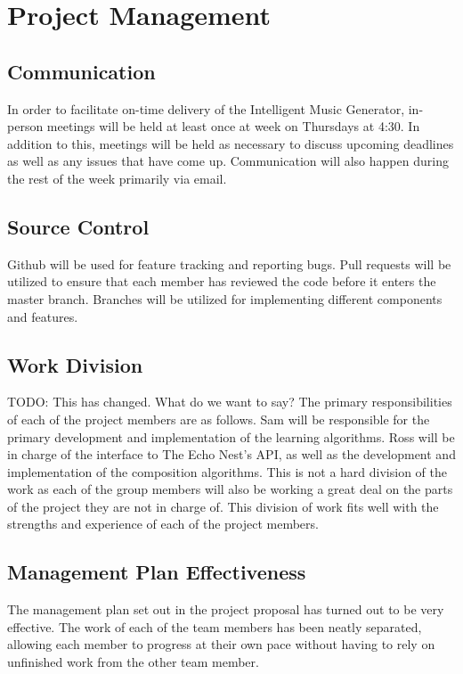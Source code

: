 \documentclass{article}
\begin{document}
\section{Project Management}
\subsection{Communication}
In order to facilitate on-time delivery of the Intelligent Music Generator, in-person meetings 
will be held at least once at week on Thursdays at 4:30. In addition to this, meetings will be 
held as necessary to discuss upcoming deadlines as well as any issues that have come up. 
Communication will also happen during the rest of the week primarily via email.


\subsection{Source Control}
Github will be used for feature tracking and reporting bugs.  Pull requests will be utilized to 
ensure that each member has reviewed the code before it enters the master branch.  Branches will 
be utilized for implementing different components and features.

\subsection{Work Division}
\Large{TODO: This has changed. What do we want to say?}
The primary responsibilities of each of the project members are as follows. Sam will be 
responsible for the primary development and implementation of the learning algorithms. Ross will 
be in charge of the interface to The Echo Nest's API, as well as the development and 
implementation of the composition algorithms. This is not a hard division of the work as each of 
the group members will also be working a great deal on the parts of the project they are not in
charge of. This division of work fits well with the strengths and experience of each of the 
project members.

\subsection{Management Plan Effectiveness}
The management plan set out in the project proposal has turned out to be very effective. The work
of each of the team members has been neatly separated, allowing each member to progress at their
own pace without having to rely on unfinished work from the other team member. 
\end{document}
